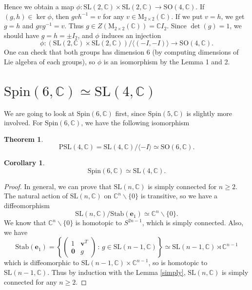 \documentclass{article}
\newtheorem{theorem}{Theorem}
\newtheorem{corollary}{Corollary}
\newcommand{\bC}{\mathbb{C}}
\newcommand{\PSL}{\mathrm{PSL}}
\newcommand{\SO}{\mathrm{SO}}
\newcommand{\SL}{\mathrm{SL}}
\newcommand{\Spin}{\mathrm{Spin}}
\newcommand{\Stab}{\mathrm{Stab}}
\newcommand{\Ma}{\mathrm{M}}
\begin{document}
Hence we obtain a map $\phi:\SL(2, \mathbb{C})\times \SL(2, \mathbb{C})\to \SO(4, \mathbb{C})$. 
If $(g, h)\in \ker\phi$, then $gvh^{-1} = v$ for any $v\in \Ma_{2\times 2}(\mathbb{C})$. If we put $v = h$, we get $g = h$ and $gvg^{-1} = v$. Thus $g\in Z(\Ma_{2\times 2}(\mathbb{C})) = \mathbb{C}I_{2}$. 
Since $\det(g) = 1$, we should have $g = h = \pm I_{2}$, and $\phi$ induces an injection 
$$
\phi:(\SL(2, \mathbb{C})\times\SL(2, \mathbb{C})) / \langle (-I, -I)\rangle \to  \SO(4, \mathbb{C}). 
$$
One can check that both groups has dimension 6 (by computing dimensions of Lie algebra of each groups), so $\phi$ is an isomorphism by the Lemma 1 and 2. 




\section{$\Spin(6, \mathbb{C})\simeq \SL(4, \mathbb{C})$}
We are going to look at $\Spin(6, \mathbb{C})$ first, since $\Spin(5, \mathbb{C})$ is slightly more involved.
For $\Spin(6, \mathbb{C})$, we have the following isomorphism
\begin{theorem}
$$\PSL(4, \bC) = \SL(4, \mathbb{C})/\langle -I\rangle \simeq \SO(6, \mathbb{C}).$$
\end{theorem}
\begin{corollary}
$$
\Spin(6, \mathbb{C})\simeq \SL(4, \mathbb{C}). 
$$
\end{corollary}

\begin{proof}
In general, we can prove that $\SL(n, \mathbb{C})$ is simply connected for $n\geq 2$. 
The natural action of $\SL(n, \mathbb{C})$ on $\mathbb{C}^{n}\backslash \{0\}$ is transitive, so we have a diffeomorphism 
$$
\SL(n, \mathbb{C})/\Stab(\mathbf{e}_{1}) \simeq \mathbb{C}^{n}\backslash \{0\}. 
$$
We know that $\mathbb{C}^{n}\backslash \{0\}$ is homotopic to $S^{2n-1}$, which is simply connected. 
Also, we have
$$
\Stab(\mathbf{e}_{1}) = \left\{\begin{pmatrix} 1 & \mathbf{v}^{T} \\ \mathbf{0} & g\end{pmatrix}\,:\, g\in \SL(n-1, \mathbb{C})\right\}\simeq \SL(n-1, \mathbb{C}) \rtimes\mathbb{C}^{n-1}
$$
which is diffeomorphic to $\SL(n-1, \mathbb{C})\times \mathbb{C}^{n-1}$, so is homotopic to $\SL(n-1, \mathbb{C})$. 
Thus by induction with the Lemma \ref{simply}, $\SL(n, \mathbb{C})$ is simply connected for any $n\geq 2$. 
\end{proof}
\end{document}
